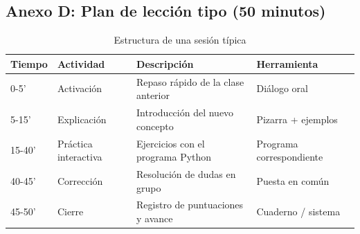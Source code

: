 \documentclass[12pt,spanish]{article}
\begin{document}
\subsection{Anexo D: Plan de lección tipo (50 minutos)}

\begin{table}[H]
\centering
\caption{Estructura de una sesión típica}
\label{tab:leccion}
\begin{tabular}{|p{2.5cm}|p{4cm}|p{5cm}|p{2.5cm}|}
\hline
\textbf{Tiempo} & \textbf{Actividad} & \textbf{Descripción} & \textbf{Herramienta} \\
\hline
0-5' & Activación & Repaso rápido de la clase anterior & Diálogo oral \\
\hline
5-15' & Explicación & Introducción del nuevo concepto & Pizarra + ejemplos \\
\hline
15-40' & Práctica interactiva & Ejercicios con el programa Python & Programa correspondiente \\
\hline
40-45' & Corrección & Resolución de dudas en grupo & Puesta en común \\
\hline
45-50' & Cierre & Registro de puntuaciones y avance & Cuaderno / sistema \\
\hline
\end{tabular}
\end{table}
\end{document}
